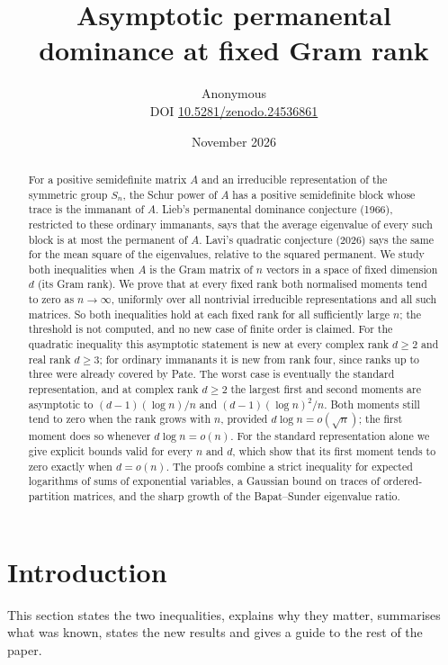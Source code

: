 \documentclass[11pt,a4paper]{article}
\title{Asymptotic permanental dominance at fixed Gram rank}
\author{Anonymous\\[3pt]{\small DOI \href{https://doi.org/10.5281/zenodo.24536861}{10.5281/zenodo.24536861}}}
\date{November 2026}
\theoremstyle{remark}
\begin{document}
\maketitle
\begin{abstract}
For a positive semidefinite matrix $A$ and an irreducible representation of the symmetric group $S_n$, the Schur power of $A$ has a positive semidefinite block whose trace is the immanant of $A$. Lieb's permanental dominance conjecture (1966), restricted to these ordinary immanants, says that the average eigenvalue of every such block is at most the permanent of $A$. Lavi's quadratic conjecture (2026) says the same for the mean square of the eigenvalues, relative to the squared permanent. We study both inequalities when $A$ is the Gram matrix of $n$ vectors in a space of fixed dimension $d$ (its Gram rank). We prove that at every fixed rank both normalised moments tend to zero as $n\to\infty$, uniformly over all nontrivial irreducible representations and all such matrices. So both inequalities hold at each fixed rank for all sufficiently large $n$; the threshold is not computed, and no new case of finite order is claimed. For the quadratic inequality this asymptotic statement is new at every complex rank $d\ge2$ and real rank $d\ge3$; for ordinary immanants it is new from rank four, since ranks up to three were already covered by Pate. The worst case is eventually the standard representation, and at complex rank $d\ge2$ the largest first and second moments are asymptotic to $(d-1)(\log n)/n$ and $(d-1)(\log n)^2/n$. Both moments still tend to zero when the rank grows with $n$, provided $d\log n=o(\sqrt n)$; the first moment does so whenever $d\log n=o(n)$. For the standard representation alone we give explicit bounds valid for every $n$ and $d$, which show that its first moment tends to zero exactly when $d=o(n)$. The proofs combine a strict inequality for expected logarithms of sums of exponential variables, a Gaussian bound on traces of ordered-partition matrices, and the sharp growth of the Bapat--Sunder eigenvalue ratio.
\end{abstract}

\section{Introduction}\label{sec:intro}
This section states the two inequalities, explains why they matter, summarises what was known, states the new results and gives a guide to the rest of the paper.
\end{document}
